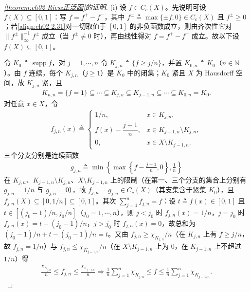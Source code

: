 \documentclass[../../main.tex]{subfiles}%
\begin{document}
\begin{proof}[\cref{theorem:ch02-Riesz正泛函}的证明]
(i) 设 $f\in C_c(X)$。先说明可设 $f(X)\subseteq[0,1]$：写 $f=f^+-f^-$，其中 $f^\pm\triangleq\max\{\pm f,0\}\in C_c(X)$ 且 $f^\pm\geqslant0$；若\eqref{align:ch02-2.31}对一切取值于 $[0,1]$ 的非负函数成立，则由齐次性它对 $\|f^\pm\|_\infty^{-1}f^\pm$ 成立（当 $f^\pm\neq0$ 时），再由线性得对 $f=f^+-f^-$ 成立。故以下设 $f(X)\subseteq[0,1]$。

令 $K_0\triangleq\operatorname{supp}f$，对 $j=1,\cdots,n$ 令 $K_{j,n}\triangleq\{f\geqslant j/n\}$，并置 $K_{0,n}\triangleq K_0$（$n\in\mathbb N$）。由 $f$ 连续，每个 $K_{j,n}$（$j\geqslant1$）是 $K_0$ 中的闭集；$K_0$ 紧且 $X$ 为 Hausdorff 空间，故 $K_{j,n}$ 紧，且
\begin{align*}
K_{n,n}=\{f=1\}\subseteq\cdots\subseteq K_{j,n}\subseteq K_{j-1,n}\subseteq\cdots\subseteq K_{0,n}=K_0.
\end{align*}
对任意 $x\in X$，令
\begin{align*}
f_{j,n}(x)\triangleq
\begin{cases}
1/n, & x\in K_{j,n},\\
f(x)-\dfrac{j-1}n, & x\in K_{j-1,n}\setminus K_{j,n},\\
0, & x\in X\setminus K_{j-1,n}.
\end{cases}
\end{align*}
三个分支分别是连续函数
\begin{align*}
g_{j,n}\triangleq\min\left\{\max\left\{f-\frac{j-1}n,0\right\},\frac1n\right\}
\end{align*}
在 $K_{j,n}$、$K_{j-1,n}\setminus K_{j,n}$、$X\setminus K_{j-1,n}$ 上的限制（在第一、三个分支的集合上分别有 $g_{j,n}=1/n$ 与 $g_{j,n}=0$），故 $f_{j,n}=g_{j,n}\in C_c(X)$（其支集含于紧集 $K_0$），且 $f_{j,n}(X)\subseteq[0,1/n]\subseteq[0,1]$。其次 $\sum_{j=1}^nf_{j,n}=f$：设 $t\triangleq f(x)\in[0,1]$ 且 $t\in[(j_0-1)/n,j_0/n]$（$j_0=1,\cdots,n$），则 $j<j_0$ 时 $f_{j,n}(x)=1/n$，$j=j_0$ 时 $f_{j,n}(x)=t-(j_0-1)/n$，$j>j_0$ 时 $f_{j,n}(x)=0$，故总和为 $(j_0-1)/n+t-(j_0-1)/n=t$。又由 $f_{j,n}\geqslant\chi_{K_{j,n}}/n$（在 $K_{j,n}$ 上有 $f\geqslant j/n$，故 $f_{j,n}=1/n$）与 $f_{j,n}\leqslant\chi_{K_{j-1,n}}/n$（在 $X\setminus K_{j-1,n}$ 上为 $0$，在 $K_{j-1,n}$ 上不超过 $1/n$）得
\begin{align}
\frac{\chi_{K_{j,n}}}{n}\leqslant f_{j,n}\leqslant\frac{\chi_{K_{j-1,n}}}{n}
\Rightarrow\frac1n\sum_{j=1}^n\chi_{K_{j,n}}\leqslant f\leqslant\frac1n\sum_{j=1}^n\chi_{K_{j-1,n}}. \label{align:ch02-2.42}
\end{align}


\end{proof}
\end{document}
